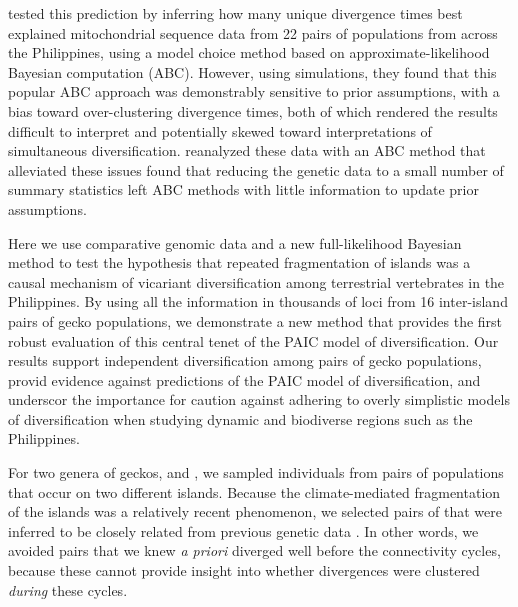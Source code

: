\citet{Oaks2012}  tested this prediction  by inferring how many unique
divergence times best explained mitochondrial sequence data from 22 pairs of
populations from across the Philippines, using a model choice method based on
approximate-likelihood Bayesian computation (ABC).
However, using simulations, they found that this popular ABC approach was
demonstrably sensitive to prior assumptions, with a bias toward over-clustering
divergence times, both of which rendered the results difficult to interpret
and potentially skewed toward interpretations of simultaneous diversification.
\citet{Oaks2014dpp} reanalyzed these data with an ABC method that alleviated
these issues found that reducing the genetic data to a small
number of summary statistics left ABC methods with little information to update
prior assumptions.

Here we use comparative genomic data and a new full-likelihood Bayesian method
to test the hypothesis that repeated fragmentation of islands was a causal
mechanism of vicariant diversification among terrestrial vertebrates in the
Philippines.
By using all the information in thousands of loci from 16 inter-island
pairs of gecko populations,
we demonstrate a new method that provides the first robust evaluation of
this central tenet of the PAIC model of diversification.
Our results support independent diversification among pairs of gecko
populations,
provid evidence against  predictions of
the PAIC model of diversification,
and underscor the importance for caution against adhering to
overly simplistic models of diversification  when studying dynamic and biodiverse regions such as the
Philippines.



For two genera of geckos,  and , we sampled
individuals from pairs of populations that occur on two different islands.
Because the climate-mediated fragmentation of the islands was a relatively
recent phenomenon, we selected  pairs of
 that were inferred to be closely related
from previous genetic data
\citep{Siler2012, Siler2014kikuchii, Welton2010, Welton2010zootaxa, Siler2010}.
In other words, we avoided pairs that we knew \emph{a priori} diverged well
before the connectivity cycles, because these cannot provide insight into
whether divergences were clustered \emph{during} these cycles.


